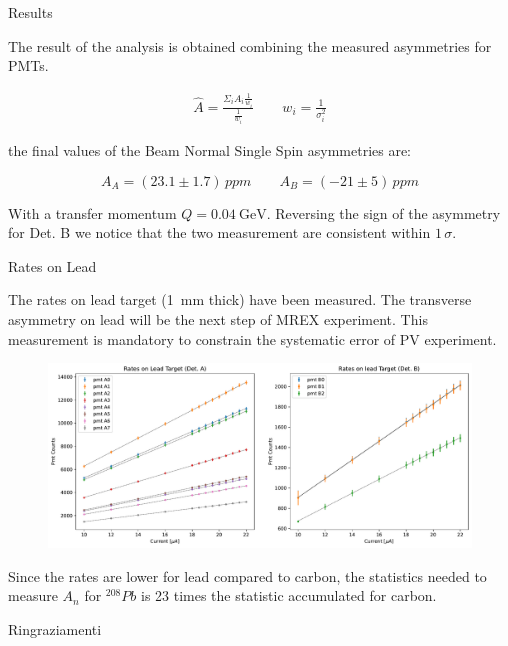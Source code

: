 \documentclass[9pt,a4paper]{beamer}
\begin{document}
\begin{frame}{Results}


The result of the analysis is obtained combining the measured asymmetries for PMTs. 

\begin{gather*}
\hat{A} =  \frac{\Sigma_{i} A_{i} \frac{1}{w_{i}}}{\frac{1}{w_{i}}} \qquad w_{i} = \frac{1}{\sigma^{2}_{i}}
\end{gather*}

the final values of the Beam Normal Single Spin asymmetries are:

\begin{equation}
A_{A} = (23.1 \pm 1.7) \, ppm  \qquad A_{B} = (-21 \pm 5) \, ppm
\end{equation}

With a transfer momentum $Q = \SI{0.04}{\giga \electronvolt}$. Reversing the sign of the asymmetry for Det. B we notice that the two measurement are consistent within $1 \, \sigma$. 

\end{frame}

\begin{frame}{Rates on Lead}

The rates on lead target (\SI{1}{\milli \meter} thick) have been measured. The transverse asymmetry on lead will be the next step of MREX experiment. This measurement is mandatory to constrain the systematic error of PV experiment.

\begin{figure}[hbtp]
\centering
\includegraphics[width = \textwidth]{figures/LeadRates.pdf}
\end{figure}

Since the rates are lower for lead compared to carbon, the statistics needed to measure $A_{n}$ for $^{208}Pb$ is 23 times the statistic accumulated for carbon.
\end{frame}

\begin{frame}{Ringraziamenti}
\begin{center}
\end{center}
\end{frame}
\end{document}

